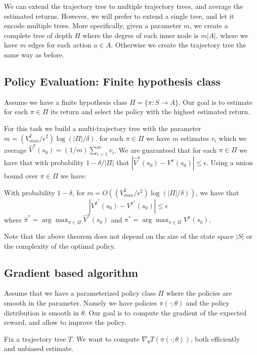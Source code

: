 We can extend the trajectory tree to multiple trajectory trees, and
average the estimated returns. However, we will prefer to extend a
single tree, and let it encode multiple trees. More specifically,
given a parameter $m$, we create a complete tree of depth $H$ where
the degree of each inner node is $m|A|$, where we have $m$ edges for
each action $a\in A$. Otherwise we create the trajectory tree the
same way as before.

\subsection{Policy Evaluation: Finite hypothesis class}

Assume we have a finite hypothesis class $\Pi=\{\pi:S\rightarrow
A\}$. Our goal is to estimate for each $\pi\in \Pi$ its return and
select the policy with the highest estimated return.

For this task we build a multi-trajectory tree with the parameter
$m=(V^2_{max} /\epsilon^2)\log (|\Pi|/\delta)$. for each $\pi\in
\Pi$ we have $m$ estimates $v_i$ which we average
$\hat{V}^\pi(s_0)=(1/m)\sum_{i=1}^m v_i$. We are guaranteed that for
each $\pi\in \Pi$ we have that with probability $1-\delta/|\Pi|$
that $|\hat{V}^\pi(s_0)-V^\pi(s_0)|\leq \epsilon$. Using a union
bound over $\pi\in \Pi$ we have:

\begin{theorem}
With probability $1-\delta$, for $m=O((V^2_{max} /\epsilon^2)\log
(|\Pi|/\delta))$, we have that
\[
|V^{\hat{\pi}^*}(s_0)-V^{\pi^*}(s_0)|\leq \epsilon
\]
where $\hat{\pi}^*=\arg\max_{\pi\in\Pi} \hat{V}^\pi(s_0)$ and
$\pi^*=\arg\max_{\pi\in\Pi} V^\pi(s_0)$.
\end{theorem}
Note that the above theorem does not depend on the size of the state
space $|S|$ or the complexity of the optimal policy.

\subsection{Gradient based algorithm}

Assume that we have a parameterized policy class $\Pi$ where the
policies are smooth in the parameter. Namely we have policies
$\pi(\cdot;\theta)$ and the policy distribution is smooth in
$\theta$. Our goal is to compute the gradient of the expected
reward, and allow to improve the policy.

Fix a trajectory tree $T$. We want to compute $\nabla_\theta
T(\pi(\cdot;\theta))$, both efficiently and unbiased estimate.

